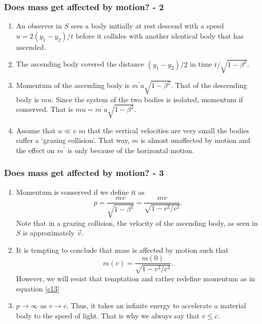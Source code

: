 \documentclass{beamer}
\begin{document}
\begin{frame}
\frametitle{Does mass get affected by motion? - 2}
\begin{enumerate}
\item An observer in $S$ sees a body initially at rest descend with a speed 
$u = 2(y_1 - y_2)/t$ before it collides with another identical body that has
ascended.
\item The ascending body covered the distance $(y_1 - y_2)/2$ in time 
$t/\sqrt{1 - \beta^2}$. 
\item Momentum of the ascending body is $m^\prime u\sqrt{1 - \beta^2}$. That of 
the descending body is $mu$. Since the system of the two bodies is isolated, 
momentum if conserved. That is $mu = m^\prime u\sqrt{1 - \beta^2}$.
\item Assume that $u \ll v$ so that the vertical velocities are very small the
bodies suffer a `grazing collision'. That way, $m$ is almost unaffected by 
motion and the effect on $m^\prime$ is only because of the horizontal motion.
\end{enumerate}
\end{frame}

\begin{frame}
\frametitle{Does mass get affected by motion? - 3}
\begin{enumerate}
\item Momentum is conserved if we define it as
\begin{equation}\label{e13}
p = \frac{mv}{\sqrt{1 - \beta^2}} = \frac{mv}{\sqrt{1 - v^2/c^2}} .
\end{equation}
Note that in a grazing collision, the velocity of the ascending body, as seen
in $S$ is approximately $\vec{v}$.
\item It is tempting to conclude that mass is affected by motion such that
\begin{equation}\label{e14}
m(v) = \frac{m(0)}{\sqrt{1 - v^2/c^2}}.
\end{equation}
However, we will resist that temptation and rather redefine momentum as in
equation \eqref{e13}
\item $p \rightarrow \infty$ as $v \rightarrow c$. Thus, it takes an infinite
energy to accelerate a material body to the speed of light. That is why we
always say that $v \le c$. 
\end{enumerate}
\end{frame}
\end{document}
